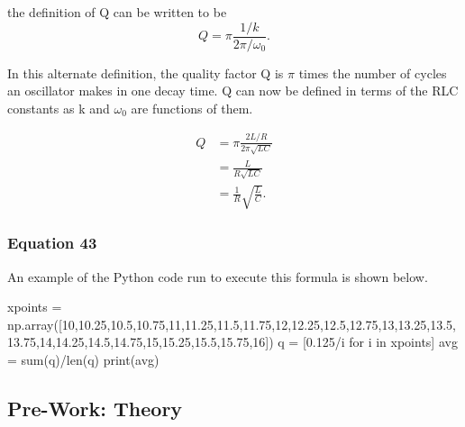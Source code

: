\documentclass{article}
\begin{document}
the definition of Q can be written to be 
\begin{equation}
    Q = \pi\frac{1/k}{2\pi / \omega_0}.
\end{equation}

In this alternate definition, the quality factor Q is $\pi$ times the number of cycles
an oscillator makes in one decay time. Q can now be defined in terms of the RLC constants
as k and $\omega_0$ are functions of them.

\begin{equation}
    \begin{split}
        Q &= \pi \frac{2L/R}{2\pi\sqrt{LC}} \\
        &= \frac{L}{R\sqrt{LC}} \\
        & = \frac{1}{R}\sqrt{\frac{L}{C}}.
    \end{split}
\end{equation}
\subsubsection{Equation 43} \label{d3}
An example of the Python code run to execute this formula is shown below.
\begin{python}
    xpoints = np.array([10,10.25,10.5,10.75,11,11.25,11.5,11.75,12,12.25,12.5,12.75,13,13.25,13.5,13.75,14,14.25,14.5,14.75,15,15.25,15.5,15.75,16])
    q = [0.125/i for i in xpoints]
    avg = sum(q)/len(q)
    print(avg)
\end{python}
\subsection{Pre-Work: Theory}
\end{document}
